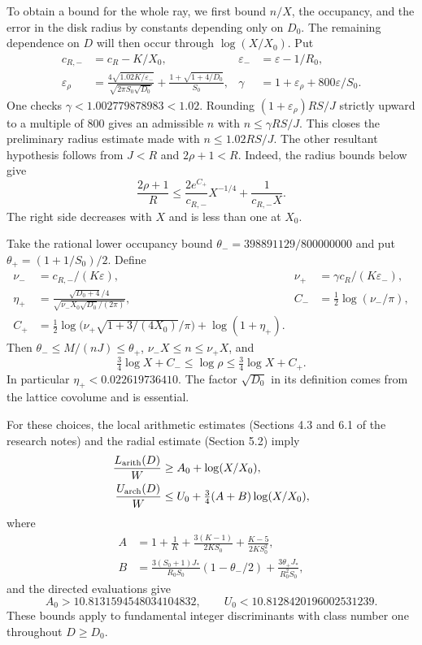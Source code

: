 To obtain a bound for the whole ray, we first bound $n/X$, the occupancy,
and the error in the disk radius by constants depending only on $D_0$.
The remaining dependence on $D$ will then occur through $\log(X/X_0)$. Put
\begin{align*}
 c_{R,-}&=c_R-K/X_0,&\varepsilon_-&=\varepsilon-1/R_0,\\
 \varepsilon_\rho&=\frac{4\sqrt{1.02K/\varepsilon_-}}
                {\sqrt{2\pi S_0\sqrt{D_0}}}
       +\frac{1+\sqrt{1+4/D_0}}{S_0},&
 \gamma&=1+\varepsilon_\rho+800\varepsilon/S_0.
\end{align*}
One checks $\gamma<1.002779878983<1.02$. Rounding
$(1+\varepsilon_\rho)RS/J$ strictly upward to a multiple of $800$ gives an admissible $n$ with
$n\leq\gamma RS/J$. This closes the preliminary radius estimate made with $n\leq1.02RS/J$. The other resultant hypothesis follows from $J<R$ and $2\rho+1<R$.
Indeed, the radius bounds below give
\[
 \frac{2\rho+1}{R}\leq
 \frac{2e^{C_+}}{c_{R,-}}X^{-1/4}+\frac1{c_{R,-}X}.
\]
The right side decreases with $X$ and is less than one at $X_0$.

Take the rational lower occupancy bound
$\theta_-=398891129/800000000$ and put $\theta_+=(1+1/S_0)/2$. Define
\begin{align*}
 \nu_-&=c_{R,-}/(K\varepsilon),&
 \nu_+&=\gamma c_R/(K\varepsilon_-),\\
 \eta_+&=\frac{\sqrt{D_0+4}/4}
               {\sqrt{\nu_-X_0\sqrt{D_0}/(2\pi)}},&
 C_-&=\tfrac12\log(\nu_-/\pi),\\
 C_+&=\tfrac12\log\bigl(\nu_+\sqrt{1+3/(4X_0)}/\pi\bigr)
                           +\log(1+\eta_+).
\end{align*}
Then $\theta_-\leq M/(nJ)\leq\theta_+$, $\nu_-X\leq n\leq\nu_+X$, and
\begin{equation}\label{eq:tail-radius}
 \tfrac34\log X+C_-\leq\log\rho\leq\tfrac34\log X+C_+.
\end{equation}
In particular $\eta_+<0.022619736410$. The factor $\sqrt{D_0}$ in its definition comes from the lattice covolume and is essential.

\begin{proposition}
\label{prop:uniform-tail}
For these choices, the local arithmetic estimates (Sections 4.3 and 6.1 of the research notes) and the radial estimate (Section 5.2) imply
\begin{align}
 \frac{L_{\rm arith}(D)}{W}&\geq A_0+\log(X/X_0),\label{eq:tail-arith}\\
 \frac{U_{\rm arch}(D)}{W}&\leq U_0+\tfrac34(A+B)\log(X/X_0),\label{eq:tail-metric}
\end{align}
where
\begin{align*}
 A&=1+\frac1K+\frac{3(K-1)}{2KS_0}+\frac{K-5}{2KS_0^2},\\
 B&=\frac{3(S_0+1)J_*}{R_0S_0}(1-\theta_-/2)
                  +\frac{3\theta_+J_*}{R_0^2S_0},
\end{align*}
and the directed evaluations give
\[
 A_0>10.8131594548034104832,
 \qquad U_0<10.8128420196002531239.
\]
These bounds apply to fundamental integer discriminants with class number one throughout $D\geq D_0$.
\end{proposition}

